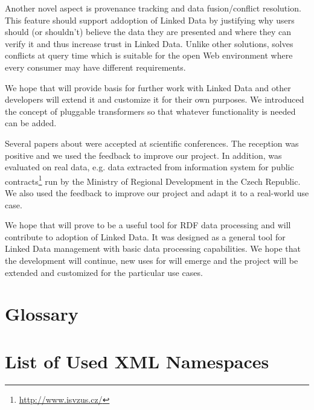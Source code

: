Another novel aspect is provenance tracking and data fusion/conflict resolution. This feature should support addoption of Linked Data by justifying why users should (or shouldn't) believe the data they are presented and where they can verify it and thus increase trust in Linked Data. Unlike other solutions, \odcs solves conflicts at query time which is suitable for the open Web environment where every consumer may have different requirements.

We hope that \odcs will provide basis for further work with Linked Data and other developers will extend it and customize it for their own purposes. We introduced the concept of pluggable transformers so that whatever functionality is needed can be added.

Several papers about \odcs were accepted at scientific conferences. The reception was positive and we used the feedback to improve our project. In addition, \odcs was evaluated on real data, e.g. data extracted from information system for public contracts\footnote{\url{http://www.isvzus.cz/}} run by the Ministry of Regional Development in the Czech Republic. We also used the feedback to improve our project and adapt it to a real-world use case.

We hope that \odcs will prove to be a useful tool for RDF data processing and will contribute to adoption of Linked Data. It was designed as a general tool for Linked Data management with basic data processing capabilities. We hope that the development will continue, new uses for \odcs will emerge and the project will be extended and customized for the particular use cases.




\appendix

\chapter{Glossary}
\label{chap:glossary}


\chapter{List of Used XML Namespaces}



